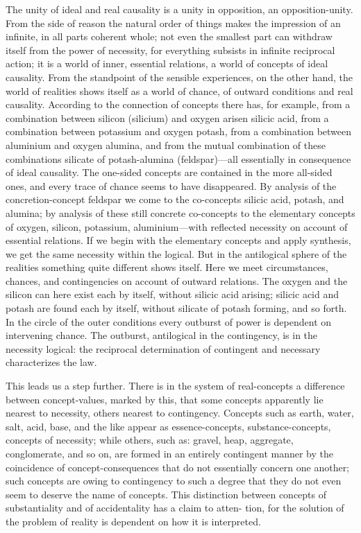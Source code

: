 \documentclass[12pt]{article}
\begin{document}
The unity of ideal and real causality is a unity in opposition, an
opposition-unity. From the side of reason the natural order of things makes
the impression of an infinite, in all parts coherent whole; not even the
smallest part can withdraw itself from the power of necessity, for
everything subsists in infinite reciprocal action; it is a world of inner,
essential relations, a world of concepts of ideal causality. From the
standpoint of the sensible experiences, on the other hand, the world of
realities shows itself as a world of chance, of outward conditions and real
causality. According to the connection of concepts there has, for example,
from a
combination between silicon (silicium) and oxygen arisen silicic acid, from
a combination between potassium and oxygen potash, from a combination
between aluminium and oxygen alumina, and from the mutual combination of
these combinations silicate of potash-alumina (feldspar)—all essentially in
consequence of ideal causality. The one-sided concepts are contained in the
more all-sided ones, and every trace of chance seems to have disappeared. By
analysis of the concretion-concept feldspar we come to the co-concepts
silicic acid, potash, and alumina; by analysis of these still concrete
co-concepts to the elementary concepts of oxygen, silicon, potassium,
aluminium—with reflected necessity on account of essential relations. If we
begin with the elementary concepts and apply synthesis, we get the same
necessity within the logical. But in the antilogical sphere of the realities
something quite different shows itself. Here we meet circumstances, chances,
and contingencies on account of outward relations. The oxygen and the
silicon can here exist each by itself, without silicic acid arising; silicic
acid and potash are found each by itself, without silicate of potash
forming, and so forth. In the circle of the outer conditions every outburst
of power is dependent on intervening chance. The outburst, antilogical in
the contingency, is in the necessity logical: the reciprocal determination
of contingent and necessary characterizes the law.

This leads us a step further. There is in the system of real-concepts a
difference between concept-values, marked by this, that some concepts
apparently lie nearest to necessity, others nearest to contingency. Concepts
such as earth, water, salt, acid, base, and the like appear as
essence-concepts, substance-concepts, concepts of necessity; while others,
such as: gravel, heap, aggregate, conglomerate, and so on, are formed in an
entirely contingent manner by the coincidence of concept-consequences that
do not essentially concern one another; such concepts are owing to
contingency to such a degree that they do not even seem to deserve the name
of concepts. This distinction between concepts of substantiality and of
accidentality has a claim to atten-
tion, for the solution of the problem of reality is dependent on how it is
interpreted.
\end{document}
